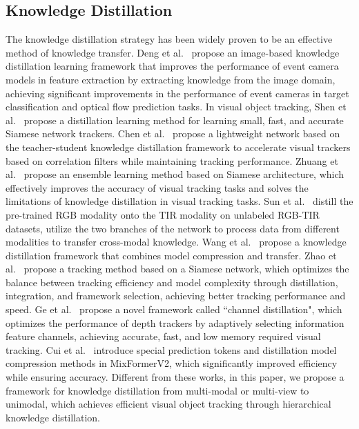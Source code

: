 \subsection{Knowledge Distillation}  \label{subsec:kd}
The knowledge distillation strategy has been widely proven to be an effective method of knowledge transfer.
Deng et al.~\cite{deng2021distEvent} propose an image-based knowledge distillation learning framework that improves the performance of event camera models in feature extraction by extracting knowledge from the image domain, achieving significant improvements in the performance of event cameras in target classification and optical flow prediction tasks. 
In visual object tracking, Shen et al.~\cite{shen2021distilledSiamTrack} propose a distillation learning method for learning small, fast, and accurate Siamese network trackers. 
Chen et al.~\cite{chen2022TSKDcorrTrack} propose a lightweight network based on the teacher-student knowledge distillation framework to accelerate visual trackers based on correlation filters while maintaining tracking performance.
Zhuang et al.~\cite{zhuang2021ensembleSiamTrack} propose an ensemble learning method based on Siamese architecture, which effectively improves the accuracy of visual tracking tasks and solves the limitations of knowledge distillation in visual tracking tasks.
Sun et al.~\cite{sun2021USLCMTrack} distill the pre-trained RGB modality onto the TIR modality on unlabeled RGB-TIR datasets, utilize the two branches of the network to process data from different modalities to transfer cross-modal knowledge. 
Wang et al.~\cite{wang2020CFTrack} propose a knowledge distillation framework that combines model compression and transfer. 
Zhao et al.~\cite{zhao2022distSiamTrack} propose a tracking method based on a Siamese network, which optimizes the balance between tracking efficiency and model complexity through distillation, integration, and framework selection, achieving better tracking performance and speed. 
Ge et al.~\cite{ge2019distChannelTrack} propose a novel framework called ``channel distillation", which optimizes the performance of depth trackers by adaptively selecting information feature channels, achieving accurate, fast, and low memory required visual tracking. 
Cui et al.~\cite{cui2024mixformerv2} introduce special prediction tokens and distillation model compression methods in MixFormerV2, which significantly improved efficiency while ensuring accuracy. 
Different from these works, in this paper, we propose a framework for knowledge distillation from multi-modal or multi-view to unimodal, which achieves efficient visual object tracking through hierarchical knowledge distillation. 



